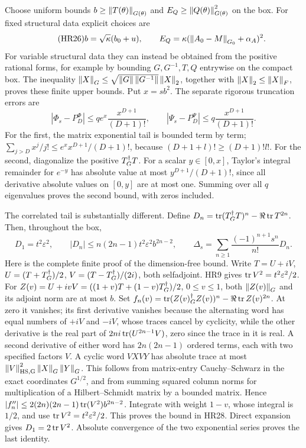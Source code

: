 \documentclass[11pt]{article}
\begin{document}
Choose uniform bounds \(b\ge\left\lVert T(\theta)\right\rVert_{G(\theta)}\) and
\(E_Q\ge\left\lVert Q(\theta)\right\rVert_{G(\theta)}^2\) on the box.
For fixed structural data explicit choices are
\begin{equation}\tag{HR26}\label{hrv:HR26}
b=\sqrt\kappa(b_0+u),\qquad
E_Q=\kappa(\left\lVert A_0-M\right\rVert_{G_0}+\alpha_A)^2.
\end{equation}
For variable structural data they can instead be obtained from the
positive rational forms, for example by bounding \(G,G^{-1},T,Q\)
entrywise on the compact box. The inequality
\(\left\lVert X\right\rVert_G\le\sqrt{\left\lVert G\right\rVert\left\lVert G^{-1}\right\rVert}\left\lVert X\right\rVert_2\), together
with \(\left\lVert X\right\rVert_2\le\left\lVert X\right\rVert_F\), proves these finite upper bounds.
Put \(x=sb^2\). The separate rigorous truncation errors are
\begin{equation}\tag{HR27}\label{hrv:HR27}
|\Phi_s-P_D^\Phi|\le q e^x\frac{x^{D+1}}{(D+1)!},\qquad
|\Psi_s-P_D^\Psi|\le q\frac{x^{D+1}}{(D+1)!}.
\end{equation}
For the first, the matrix exponential tail is bounded term by term;
\(\sum_{j>D}x^j/j!\le e^x x^{D+1}/(D+1)!\), because
\((D+1+l)!\ge(D+1)!l!\). For the second, diagonalize the positive
\(T^\dagger_G T\). For a scalar \(y\in[0,x]\), Taylor's integral remainder
for \(e^{-y}\) has absolute value at most \(y^{D+1}/(D+1)!\), since
all derivative absolute values on \([0,y]\) are at most one. Summing
over all \(q\) eigenvalues proves the second bound, with zeros included.

The correlated tail is substantially different. Define
\(D_n=\operatorname{tr}(T^\dagger_G T)^n-\Re\operatorname{tr} T^{2n}\). Then, throughout the box,
\begin{equation}\tag{HR28}\label{hrv:HR28}
D_1=t^2\varepsilon^2,\qquad
|D_n|\le n(2n-1)t^2\varepsilon^2 b^{2n-2},\qquad
\Delta_s=\sum_{n\ge1}\frac{(-1)^{n+1}s^n}{n!}D_n.
\end{equation}
Here is the complete finite proof of the dimension-free bound. Write
\(T=U+iV\), \(U=(T+T^\dagger_G)/2\), \(V=(T-T^\dagger_G)/(2i)\), both
selfadjoint. HR9 gives \(\operatorname{tr} V^2=t^2\varepsilon^2/2\).
For \(Z(v)=U+ivV=((1+v)T+(1-v)T^\dagger_G)/2\), \(0\le v\le1\),
both \(\left\lVert Z(v)\right\rVert_G\) and its adjoint norm are at most \(b\).
Set \(f_n(v)=\operatorname{tr}(Z(v)^\dagger_G Z(v))^n-\Re\operatorname{tr} Z(v)^{2n}\).
At zero it vanishes; its first derivative vanishes because the alternating
word has equal numbers of \(+iV\) and \(-iV\), whose traces cancel by
cyclicity, while the other derivative is the real part of
\(2ni\operatorname{tr}(U^{2n-1}V)\), zero since the trace in it is real.
A second derivative of either word has \(2n(2n-1)\) ordered terms,
each with two specified factors \(V\). A cyclic word \(VX VY\) has
absolute trace at most \(\left\lVert V\right\rVert_{\rm HS,G}^2\left\lVert X\right\rVert_G\left\lVert Y\right\rVert_G\).
This follows from matrix-entry Cauchy--Schwarz in the exact coordinates
\(G^{1/2}\), and from summing squared column norms for multiplication
of a Hilbert--Schmidt matrix by a bounded matrix. Hence
\(|f_n''|\le2(2n)(2n-1)\operatorname{tr}(V^2)b^{2n-2}\).
Integrate with weight \(1-v\), whose integral is \(1/2\), and use
\(\operatorname{tr} V^2=t^2\varepsilon^2/2\). This proves the bound in HR28.
Direct expansion gives \(D_1=2\operatorname{tr} V^2\). Absolute convergence of the
two exponential series proves the last identity.
\end{document}
